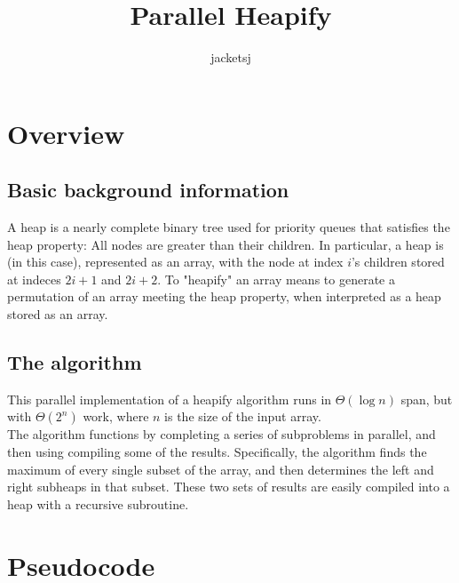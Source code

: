 \documentclass[letterpaper, reqno, 11pt]{article}
\newcommand{\ttitle}{Parallel Heapify}
\newcommand{\tname}{jacketsj}
\begin{document}
\title{\ttitle}
\author{\tname}

\maketitle

\section*{Overview}
\subsection*{Basic background information}
\indent A heap is a nearly complete binary tree used for priority queues that satisfies the heap property: All nodes are greater than their children.
In particular, a heap is (in this case), represented as an array, with the node at index $i$'s children stored at indeces $2i+1$ and $2i+2$.
To "heapify" an array means to generate a permutation of an array meeting the heap property, when interpreted as a heap stored as an array.\\
\subsection*{The algorithm}
\indent This parallel implementation of a heapify algorithm runs in $\Theta(\log n)$ span, but with $\Theta(2^n)$ work, where $n$ is the size of the input array.\\
\indent The algorithm functions by completing a series of subproblems in parallel, and then using compiling some of the results.
Specifically, the algorithm finds the maximum of every single subset of the array, and then determines the left and right subheaps in that subset.
These two sets of results are easily compiled into a heap with a recursive subroutine.

\section*{Pseudocode}
\end{document}
